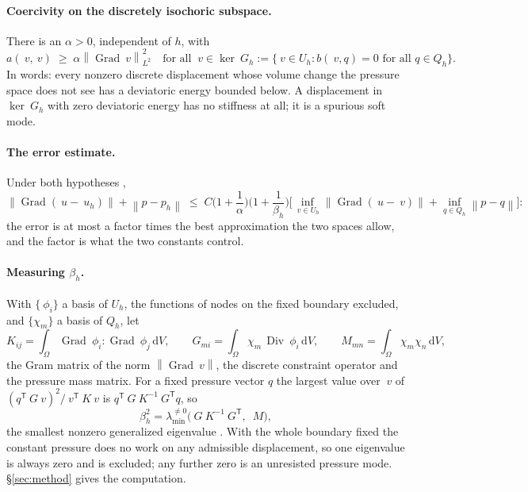 \documentclass[11pt]{article}
\newcommand{\Grad}{\operatorname{Grad}}
\newcommand{\Div}{\operatorname{Div}}
\newcommand{\transpose}[1]{#1^{\mathsf{T}}}
\newcommand{\norm}[1]{\left\lVert #1 \right\rVert}
\newcommand{\diff}{\,\mathrm{d}}
\theoremstyle{definition}
\theoremstyle{plain}
\begin{document}
\paragraph{Coercivity on the discretely isochoric subspace.} There is an
$\alpha > 0$, independent of $h$, with
\begin{equation}
  \label{eq:coercive-background}
  a(~v, ~v) \;\ge\; \alpha \norm{\Grad ~v}_{L^2}^2
  \quad \text{for all } ~v \in \ker ~G_h := \{ ~v \in U_h : b(~v, q) = 0
  \text{ for all } q \in Q_h \} .
\end{equation}
In words: every nonzero discrete displacement whose volume change the
pressure space does not see has a deviatoric energy bounded below. A
displacement in $\ker ~G_h$ with zero deviatoric energy has no stiffness at
all; it is a spurious soft mode.

\paragraph{The error estimate.} Under both hypotheses
\citep[Theorem~5.2.2]{BoffiBrezziFortin:2013},
\begin{equation}
  \label{eq:brezzi-estimate}
  \norm{\Grad(~u - ~u_h)} + \norm{p - p_h}
  \;\le\; C \Big(1 + \frac{1}{\alpha}\Big)\Big(1 + \frac{1}{\beta_h}\Big)
  \Big[ \inf_{~v \in U_h} \norm{\Grad(~u - ~v)} + \inf_{q \in Q_h} \norm{p - q} \Big] :
\end{equation}
the error is at most a factor times the best approximation the two spaces
allow, and the factor is what the two constants control.

\paragraph{Measuring $\beta_h$.} With $\{~\phi_i\}$ a basis of $U_h$, the
functions of nodes on the fixed boundary excluded, and $\{\chi_m\}$ a basis
of $Q_h$, let
\begin{equation}
  \label{eq:betamatrices}
  K_{ij} = \int_\Omega \Grad~\phi_i : \Grad~\phi_j \diff V, \qquad
  G_{mi} = \int_\Omega \chi_m \, \Div ~\phi_i \diff V, \qquad
  M_{mn} = \int_\Omega \chi_m \chi_n \diff V ,
\end{equation}
the Gram matrix of the norm $\norm{\Grad ~v}$, the discrete constraint
operator and the pressure mass matrix. For a fixed pressure vector $q$ the
largest value over $~v$ of $(\transpose{q} ~G ~v)^2 / \transpose{~v} ~K ~v$
is $\transpose{q} ~G ~K^{-1} \transpose{~G} q$, so
\begin{equation}
  \label{eq:betaeig}
  \beta_h^2 = \lambda_{\min}^{\neq 0}\big( ~G ~K^{-1} \transpose{~G},\; ~M \big) ,
\end{equation}
the smallest nonzero generalized eigenvalue \citep{ChapelleBathe:1993}. With
the whole boundary fixed the constant pressure does no work on any
admissible displacement, so one eigenvalue is always zero and is excluded;
any further zero is an unresisted pressure mode. \S\ref{sec:method} gives
the computation.
\end{document}

